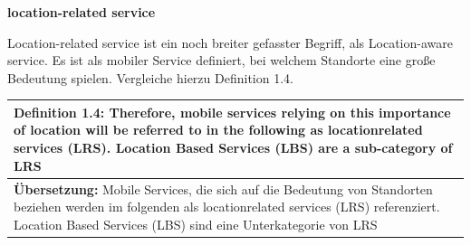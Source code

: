 \newpage
\textbf{location-related service} 

Location-related service ist ein noch breiter gefasster Begriff, als Location-aware service. Es ist als mobiler Service definiert, bei welchem Standorte eine große Bedeutung spielen. Vergleiche hierzu Definition 1.4.

\begin{table}[h]
	\centering
	\begin{tabular}{|p{16cm}|}\hline
		\textbf{Definition 1.4:} \glqq Therefore, mobile services relying on this importance of location will be referred to in the following as locationrelated services (LRS). Location Based Services (LBS) are a sub-category of LRS \grqq \cite[S.5]{strueker2003}\\ \hline
		\textbf{Übersetzung:} Mobile Services, die sich auf die Bedeutung von Standorten beziehen werden im folgenden als locationrelated services (LRS) referenziert. Location Based Services (LBS) sind eine Unterkategorie von LRS  \\ \hline
	\end{tabular}
\end{table}





